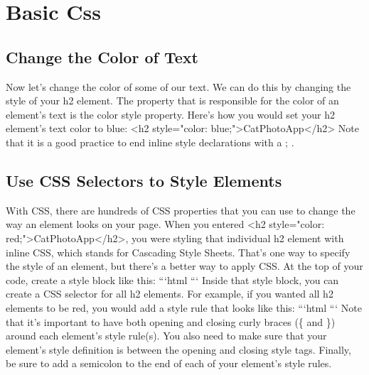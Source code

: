 \documentclass{article}%
\begin{document}
%
\newpage%
\section{Basic Css}%
\label{sec:BasicCss}%
\subsection{Change the Color of Text}%
\label{subsec:ChangetheColorofText}%
Now let's change the color of some of our text.\newline%
We can do this by changing the style of your h2 element.\newline%
The property that is responsible for the color of an element's text is the color style property.\newline%
Here's how you would set your h2 element's text color to blue:\newline%
<h2 style="color: blue;">CatPhotoApp</h2>\newline%
Note that it is a good practice to end inline style declarations with a ; .\newline%

%
\subsection{Use CSS Selectors to Style Elements}%
\label{subsec:UseCSSSelectorstoStyleElements}%
With CSS, there are hundreds of CSS properties that you can use to change the way an element looks on your page.\newline%
When you entered <h2 style="color: red;">CatPhotoApp</h2>, you were styling that individual h2 element with inline CSS, which stands for Cascading Style Sheets.\newline%
That's one way to specify the style of an element, but there's a better way to apply CSS.\newline%
At the top of your code, create a style block like this:\newline%
```html\newline%
```\newline%
Inside that style block, you can create a CSS selector for all h2 elements. For example, if you wanted all h2 elements to be red, you would add a style rule that looks like this:\newline%
```html\newline%
```\newline%
Note that it's important to have both opening and closing curly braces (\{ and \}) around each element's style rule(s). You also need to make sure that your element's style definition is between the opening and closing style tags. Finally, be sure to add a semicolon to the end of each of your element's style rules.\newline%
\end{document}
